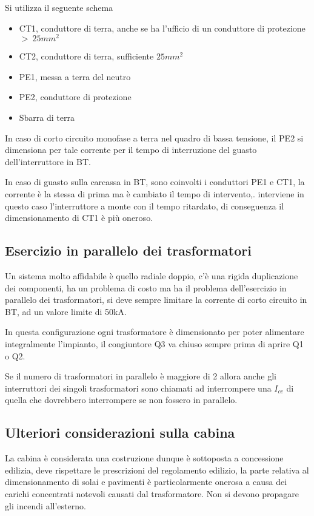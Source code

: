 Si utilizza il seguente schema
\begin{itemize}
    \item CT1, conduttore di terra, anche se ha l'ufficio di un conduttore di protezione $>\ 25mm^2$
    \item CT2, conduttore di terra, sufficiente $25mm^2$
    \item PE1, messa a terra del neutro 
    \item PE2, conduttore di protezione 
    \item Sbarra di terra
\end{itemize}
In caso di corto circuito monofase a terra nel quadro di bassa tensione, il PE2 si dimensiona per tale corrente per il tempo di interruzione del guasto dell'interruttore in BT.

In caso di guasto sulla carcassa in BT, sono coinvolti i conduttori PE1 e CT1, la corrente è la stessa di prima ma è cambiato il tempo di intervento,. interviene in questo caso l'interruttore a monte con il tempo ritardato, di conseguenza il dimensionamento di CT1 è più oneroso.

\subsection{Esercizio in parallelo dei trasformatori}
Un sistema molto affidabile è quello radiale doppio, c'è una rigida 
duplicazione dei componenti, ha un problema di costo ma ha il problema 
dell'esercizio in parallelo dei trasformatori, si deve sempre limitare la 
corrente di corto circuito in BT, ad un valore limite di 50kA.

In questa configurazione ogni trasformatore è dimensionato per poter alimentare 
integralmente l'impianto, il congiuntore Q3 va chiuso sempre prima di aprire Q1 
o Q2.

Se il numero di trasformatori in parallelo è maggiore di 2 allora anche gli interruttori dei singoli trasformatori sono chiamati ad interrompere una $I_{cc}$ di quella che dovrebbero interrompere se non fossero in parallelo.

\subsection{Ulteriori considerazioni sulla cabina}
La cabina è considerata una costruzione dunque è sottoposta a concessione edilizia, deve rispettare le prescrizioni del regolamento edilizio, la parte relativa al dimensionamento di solai e pavimenti è particolarmente onerosa a causa dei carichi concentrati notevoli causati dal trasformatore. Non si devono propagare gli incendi all'esterno.


